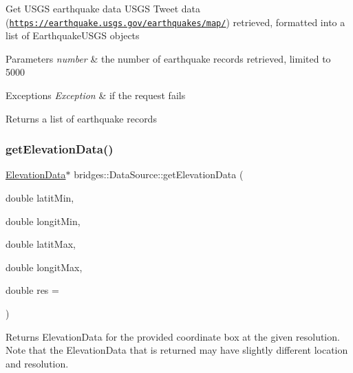 Get U\+S\+GS earthquake data U\+S\+GS Tweet data (\href{https://earthquake.usgs.gov/earthquakes/map/}{\tt https\+://earthquake.\+usgs.\+gov/earthquakes/map/}) retrieved, formatted into a list of Earthquake\+U\+S\+GS objects


\begin{DoxyParams}{Parameters}
{\em number} & the number of earthquake records retrieved, limited to 5000 \\
\hline
\end{DoxyParams}

\begin{DoxyExceptions}{Exceptions}
{\em Exception} & if the request fails\\
\hline
\end{DoxyExceptions}
\begin{DoxyReturn}{Returns}
a list of earthquake records 
\end{DoxyReturn}
\mbox{\label{classbridges_1_1_data_source_a4ddc2f97700fb443448b7de57873173b}} 
\subsubsection{\texorpdfstring{get\+Elevation\+Data()}{getElevationData()}}
{\footnotesize\ttfamily \hyperlink{classbridges_1_1dataset_1_1_elevation_data}{Elevation\+Data}$\ast$ bridges\+::\+Data\+Source\+::get\+Elevation\+Data (\begin{DoxyParamCaption}\item[{double}]{latit\+Min,  }\item[{double}]{longit\+Min,  }\item[{double}]{latit\+Max,  }\item[{double}]{longit\+Max,  }\item[{double}]{res = {} }\end{DoxyParamCaption})\hspace{0.3cm}{\ttfamily [inline]}}

Returns Elevation\+Data for the provided coordinate box at the given resolution. Note that the Elevation\+Data that is returned may have slightly different location and resolution.


